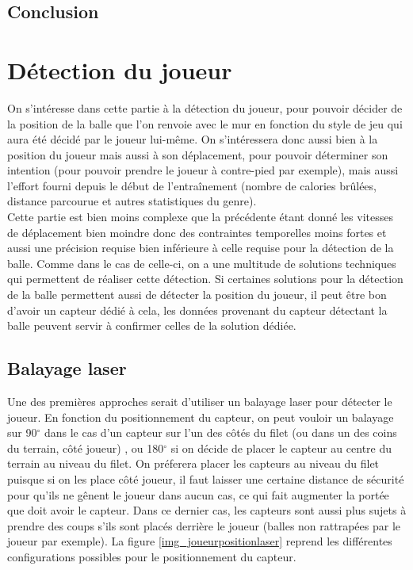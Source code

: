 \section{Conclusion}






















\chapter{Détection du joueur}

On s'intéresse dans cette partie à la détection du joueur, pour pouvoir décider de la position de la balle que l'on renvoie avec le mur en fonction du style de jeu qui aura été décidé par le joueur lui-même. On s'intéressera donc aussi bien à la position du joueur mais aussi à son déplacement, pour pouvoir déterminer son intention (pour pouvoir prendre le joueur à contre-pied par exemple), mais aussi l'effort fourni depuis le début de l'entraînement (nombre de calories brûlées, distance parcourue et autres statistiques du genre). \\

Cette partie est bien moins complexe que la précédente étant donné les vitesses de déplacement bien moindre donc des contraintes temporelles moins fortes et aussi une précision requise bien inférieure à celle requise pour la détection de la balle. Comme dans le cas de celle-ci, on a une multitude de solutions techniques qui permettent de réaliser cette détection. Si certaines solutions pour la détection de la balle permettent aussi de détecter la position du joueur, il peut être bon d'avoir un capteur dédié à cela, les données provenant du capteur détectant la balle peuvent servir à confirmer celles de la solution dédiée.


\section{Balayage laser}

Une des premières approches serait d'utiliser un balayage laser pour détecter le joueur. En fonction du positionnement du capteur, on peut vouloir un balayage sur 90$^\circ$ dans le cas d'un capteur sur l'un des côtés du filet (ou dans un des coins du terrain, côté joueur) , ou 180$^\circ$ si on décide de placer le capteur au centre du terrain au niveau du filet. On préferera placer les capteurs au niveau du filet puisque si on les place côté joueur, il faut laisser une certaine distance de sécurité pour qu'ils ne gênent le joueur dans aucun cas, ce qui fait augmenter la portée que doit avoir le capteur. Dans ce dernier cas, les capteurs sont aussi plus sujets à prendre des coups s'ils sont placés derrière le joueur (balles non rattrapées par le joueur par exemple). La figure \ref{img_joueurpositionlaser} reprend les différentes configurations possibles pour le positionnement du capteur. 

